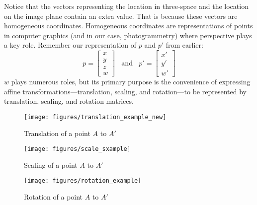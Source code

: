 \documentclass[
    12pt,
    twoside,
    bibstyle=chicago,
    headerstyle=uppercase,
	bibfile=thesis.bib
]{reedthesis}
\begin{document}
Notice that the vectors representing the location in three-space and the location on the image plane contain an extra value. That is because these vectors are homogeneous coordinates. Homogeneous coordinates are representations of points in computer graphics (and in our case, photogrammetry) where perspective plays a key role. Remember our representation of $p$ and $p'$ from earlier: \[p = \left[\begin{smallmatrix}x\\y\\z\\w\end{smallmatrix}\right]\;\; \text{ and }\;\; p' = \left[\begin{smallmatrix}x'\\y'\\w'\end{smallmatrix}\right]\] $w$ plays numerous roles, but its primary purpose is the convenience of expressing affine transformations---translation, scaling, and rotation---to be represented by translation, scaling, and rotation matrices.





\begin{figure}[p]
	   
        \centering
        \texttt{[image: figures/translation\_example\_new]}
        \caption{Translation of a point $A$ to $A'$}    \label{fig:Translation Representation}
        \bigskip%
        \texttt{[image: figures/scale\_sxample]}
        \caption{Scaling of a point $A$ to $A'$}    \label{fig:Scale Representation}
        \bigskip
        \texttt{[image: figures/rotation\_example]}
        \caption{Rotation of a point $A$ to $A'$}    \label{fig:Rotation Representation}

\end{figure}
	
\end{document}
